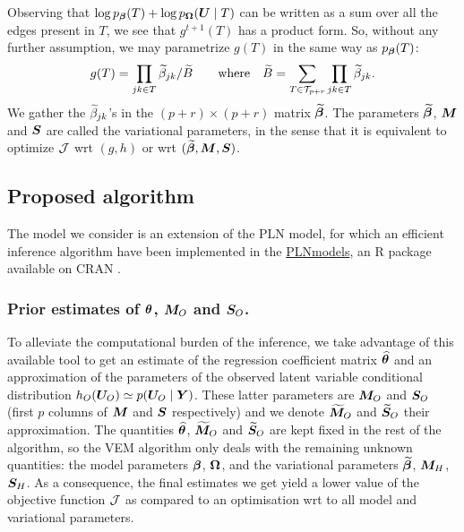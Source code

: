 Observing that $\log p_{\boldsymbol{\beta}}(T) + \log p_{{\boldsymbol{\Omega}}}({\boldsymbol{U}} \mid T)$ can be written as a sum over all the edges present in $T$, we see that $g^{t+1}(T)$ has a product form. So, without any further assumption, we may parametrize $g(T)$ in the same way as $p_{\boldsymbol{\beta}}(T)$:
\begin{equation} \label{eq:g}
g(T) = \prod_{jk \in T} {\widetilde{\beta}}_{jk} / {\widetilde{B}}
\qquad \text{where} \quad
{\widetilde{B}} = \sum_{T \in {\mathcal{T}}_{p+r}} \prod_{jk \in T} {\widetilde{\beta}}_{jk}.
\end{equation}
We gather the ${\widetilde{\beta}}_{jk}$'s in the $(p+r) \times (p+r)$ matrix ${\widetilde{{\boldsymbol{\beta}}}}$. The parameters ${\widetilde{{\boldsymbol{\beta}}}}$, ${\boldsymbol{M}}$ and ${\boldsymbol{S}}$ are called the variational parameters, in the sense that it is equivalent to optimize ${\mathcal{J}}$ wrt $(g, h)$ or wrt $({\widetilde{{\boldsymbol{\beta}}}}, {\boldsymbol{M}}, {\boldsymbol{S}})$.

\subsection{Proposed algorithm}
\label{algo}

The model we consider is an extension of the PLN model, for which an efficient inference algorithm have been implemented in the \url{PLNmodels}, an R package available on CRAN \citep{CMR18,CMR19}. 

\subsubsection*{Prior estimates of ${\boldsymbol{\theta}}$, ${\boldsymbol{M}}_O$ and ${\boldsymbol{S}}_O$.}
To alleviate the computational burden of the inference, we take advantage of this available tool to get an estimate of the regression coefficient matrix $\widehat{{\boldsymbol{\theta}}}$ and an approximation of the parameters  of the observed latent variable conditional distribution $h_O({\boldsymbol{U}}_O) \simeq p({\boldsymbol{U}}_O \mid {\boldsymbol{Y}})$. These latter parameters are ${\boldsymbol{M}}_O$ and ${\boldsymbol{S}}_O$ (first $p$  columns of ${\boldsymbol{M}}$ and ${\boldsymbol{S}}$ respectively) and we denote ${\widetilde{{\boldsymbol{M}}}}_O$ and ${\widetilde{{\boldsymbol{S}}}}_O$ their approximation. The quantities $\widehat{{\boldsymbol{\theta}}}$, ${\widetilde{{\boldsymbol{M}}}}_O$ and ${\widetilde{{\boldsymbol{S}}}}_O$ are kept fixed in the rest of the algorithm, so the VEM algorithm only deals with the remaining unknown quantities: the model parameters ${\boldsymbol{\beta}}$, ${\boldsymbol{\Omega}}$, and the variational parameters ${\widetilde{{\boldsymbol{\beta}}}}$, ${\boldsymbol{M}}_H$, ${\boldsymbol{S}}_H$. 
As a consequence, the final estimates we get yield a lower value of the objective function ${\mathcal{J}}$ as compared to  an optimisation wrt to all model and variational parameters.

